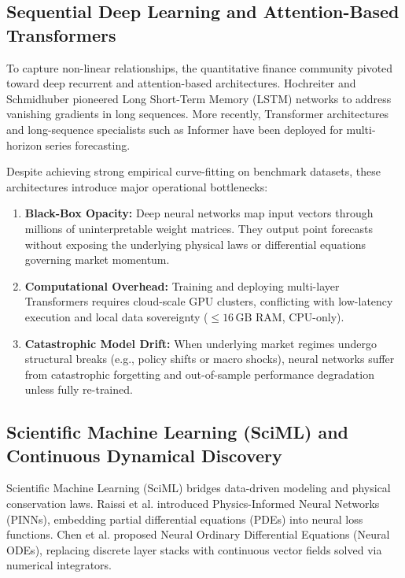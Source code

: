 \documentclass[11pt,a4paper]{article}
\begin{document}
\subsection{Sequential Deep Learning and Attention-Based Transformers}

To capture non-linear relationships, the quantitative finance community pivoted toward deep recurrent and attention-based architectures. Hochreiter and Schmidhuber \cite{hochreiter1997long} pioneered Long Short-Term Memory (LSTM) networks to address vanishing gradients in long sequences. More recently, Transformer architectures \cite{vaswani2017attention} and long-sequence specialists such as Informer \cite{zhou2021informer} have been deployed for multi-horizon series forecasting.

Despite achieving strong empirical curve-fitting on benchmark datasets, these architectures introduce major operational bottlenecks:
\begin{enumerate}[leftmargin=1.5em]
    \item \textbf{Black-Box Opacity:} Deep neural networks map input vectors through millions of uninterpretable weight matrices. They output point forecasts without exposing the underlying physical laws or differential equations governing market momentum.
    \item \textbf{Computational Overhead:} Training and deploying multi-layer Transformers requires cloud-scale GPU clusters, conflicting with low-latency execution and local data sovereignty ($\le 16\,\text{GB}$ RAM, CPU-only).
    \item \textbf{Catastrophic Model Drift:} When underlying market regimes undergo structural breaks (e.g., policy shifts or macro shocks), neural networks suffer from catastrophic forgetting and out-of-sample performance degradation unless fully re-trained.
\end{enumerate}

\subsection{Scientific Machine Learning (SciML) and Continuous Dynamical Discovery}

Scientific Machine Learning (SciML) bridges data-driven modeling and physical conservation laws. Raissi et al. \cite{raissi2019physics} introduced Physics-Informed Neural Networks (PINNs), embedding partial differential equations (PDEs) into neural loss functions. Chen et al. \cite{chen2018neural} proposed Neural Ordinary Differential Equations (Neural ODEs), replacing discrete layer stacks with continuous vector fields solved via numerical integrators.
\end{document}
